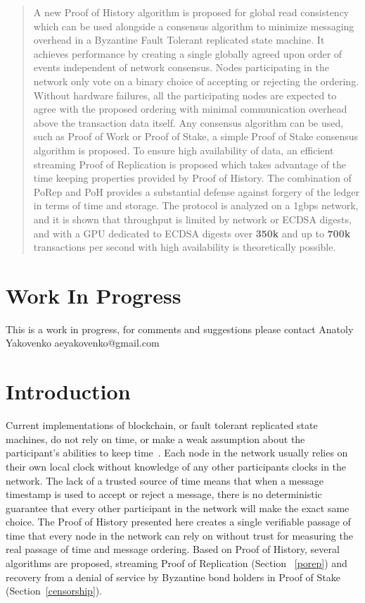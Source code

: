 \documentclass[12pt]{article}
\begin{document}
\maketitle

\begin{abstract}
A new Proof of History algorithm is proposed for global read consistency which can be used alongside a consensus algorithm to minimize messaging overhead in a Byzantine Fault Tolerant replicated state machine. It achieves performance by creating a single globally agreed upon order of events independent of network consensus. Nodes participating in the network only vote on a binary choice of accepting or rejecting the ordering. Without hardware failures, all the participating nodes are expected to agree with the proposed ordering with minimal communication overhead above the transaction data itself. Any consensus algorithm can be used, such as Proof of Work or Proof of Stake, a simple Proof of Stake consensus algorithm is proposed. To ensure high availability of data, an efficient streaming Proof of Replication is proposed which takes advantage of the time keeping properties provided by Proof of History. The combination of PoRep and PoH provides a substantial defense against forgery of the ledger in terms of time and storage. The protocol is analyzed on a 1gbps network, and it is shown that throughput is limited by network or ECDSA digests, and with a GPU dedicated to ECDSA digests over \textbf{350k} and up to \textbf{700k} transactions per second with high availability is theoretically possible.

\end{abstract}

\section{Work In Progress}
This is a work in progress, for comments and suggestions please contact Anatoly Yakovenko aeyakovenko@gmail.com

\section{Introduction}
Current implementations of blockchain, or fault tolerant replicated state machines, do not rely on time, or make a weak assumption about the participant’s abilities to keep time~\cite{tendermint}.  Each node in the network usually relies on their own local clock without knowledge of any other participants clocks in the network.  The lack of a trusted source of time means that when a message timestamp is used to accept or reject a message, there is no deterministic guarantee that every other participant in the network will make the exact same choice.  The Proof of History presented here creates a single verifiable passage of time that every node in the network can rely on without trust for measuring the real passage of time and message ordering.  Based on Proof of History, several algorithms are proposed, streaming Proof of Replication (Section ~\ref{porep}) and recovery from a denial of service by Byzantine bond holders in Proof of Stake (Section~\ref{censorship}).
\end{document}

